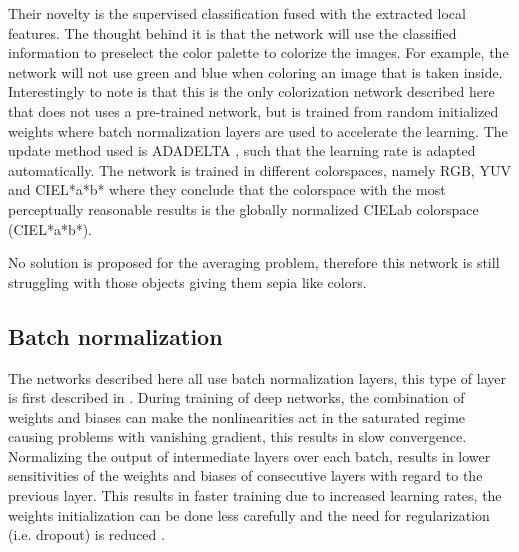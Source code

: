 Their novelty is the supervised classification fused with the extracted local features. The thought behind it is that the network will use the classified information to preselect the color palette to colorize the images. For example, the network will not use green and blue when coloring an image that is taken inside.
Interestingly to note is that this is the only colorization network described here that does not uses a pre-trained network, but is trained from random initialized weights where batch normalization layers are used to accelerate the learning. The update method used is ADADELTA \cite{zeiler2012adadelta}, such that the learning rate is adapted automatically. 
The network is trained in different colorspaces, namely RGB, YUV and CIEL*a*b* where they conclude that the colorspace with the most perceptually reasonable results is the globally normalized CIELab colorspace (CIEL*a*b*).

No solution is proposed for the averaging problem, therefore this network is still struggling with those objects giving them sepia like colors. 


\subsection{Batch normalization}\label{sec:batch_norm}
The networks described here all use batch normalization layers, this type of layer is first described in \cite{ioffe2015batch}. During training of deep networks, the combination of weights and biases can make the nonlinearities act in the saturated regime causing problems with vanishing gradient, this results in slow convergence. Normalizing the output of intermediate layers over each batch, results in lower sensitivities of the weights and biases of consecutive layers with regard to the previous layer. This results in faster training due to increased learning rates, the weights initialization can be done less carefully and the need for regularization (i.e. dropout) is reduced \cite{ioffe2015batch}. 


